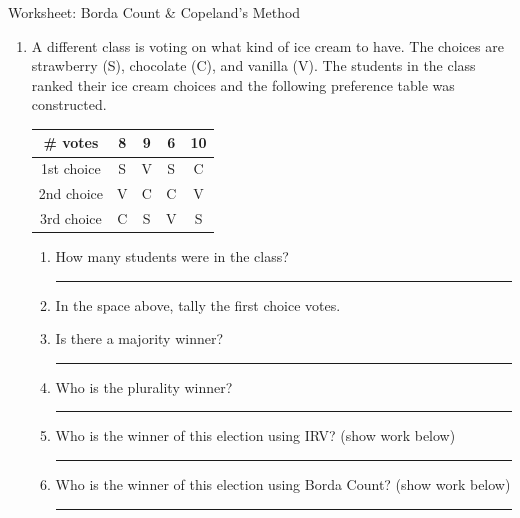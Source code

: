 \documentclass[12pt]{article}
\newcommand{\ans}[1][1in]{\rule{#1}{.5pt}}
\begin{document}
\begin{center}
{\Large  Worksheet:  Borda Count \& Copeland's Method	 	}
\end{center}



\begin{enumerate}     

\item A different class is voting on what kind of ice cream to have. The choices are strawberry (S), chocolate (C), and vanilla (V). The students in the class ranked their ice cream choices and the following preference table was constructed. 

\begingroup %
\renewcommand{\arraystretch}{2} %
    \begin{tabular}{| c  | c | c  | c  | c |} \hline
    \# votes & 8&9&6&10\\ \hline \hline
1st choice & S& V& S & C\\ \hline
2nd choice &  V &C &  C&V\\ \hline
3rd choice & C & S& V  & S\\ \hline
\end{tabular}
\endgroup 





\begin{enumerate}
\item How many students were in the class? \ans
\item In the space above, tally the first choice votes.
\item Is there a majority winner? \ans
\item Who is the plurality winner? \ans
\item Who is the winner of this election using IRV? (show work below) \ans 
\vfill

\item Who is the winner of this election using Borda Count? (show work below) \ans



\vfill




\end{enumerate}
\end{enumerate}
\end{document}
